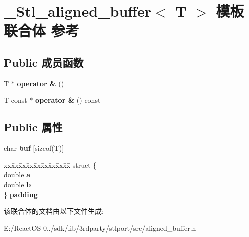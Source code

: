 \hypertarget{union___stl__aligned__buffer}{}\section{\+\_\+\+Stl\+\_\+aligned\+\_\+buffer$<$ T $>$ 模板联合体 参考}
\label{union___stl__aligned__buffer}
\subsection*{Public 成员函数}
\begin{DoxyCompactItemize}
\item 
\mbox{\label{union___stl__aligned__buffer_ad3e0c24b129e1806c54c1df4e2a81b3f}} 
T $\ast$ {\bfseries operator \&} ()
\item 
\mbox{\label{union___stl__aligned__buffer_a7ec344c10cab9dd8b8b1f2f3361209cd}} 
T const  $\ast$ {\bfseries operator \&} () const
\end{DoxyCompactItemize}
\subsection*{Public 属性}
\begin{DoxyCompactItemize}
\item 
\mbox{\label{union___stl__aligned__buffer_a441544ffacbf6a17ef257713f5caa78e}} 
char {\bfseries buf} \mbox{[}sizeof(T)\mbox{]}
\item 
\mbox{\label{union___stl__aligned__buffer_af28af32168adb70e23ac65bd4abc52b8}} 
\begin{tabbing}
xx\=xx\=xx\=xx\=xx\=xx\=xx\=xx\=xx\=\kill
struct \{\\
\>double {\bfseries a}\\
\>double {\bfseries b}\\
\} {\bfseries padding}\\

\end{tabbing}\end{DoxyCompactItemize}


该联合体的文档由以下文件生成\+:\begin{DoxyCompactItemize}
\item 
E\+:/\+React\+O\+S-\/0../sdk/lib/3rdparty/stlport/src/aligned\+\_\+buffer.\+h\end{DoxyCompactItemize}
